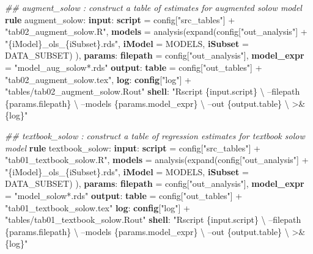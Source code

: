 \documentclass[]{book}
\newenvironment{Shaded}{\begin{snugshade}}{\end{snugshade}}
\newcommand{\KeywordTok}[1]{\textcolor[rgb]{0.13,0.29,0.53}{\textbf{{#1}}}}
\newcommand{\StringTok}[1]{\textcolor[rgb]{0.31,0.60,0.02}{{#1}}}
\newcommand{\CommentTok}[1]{\textcolor[rgb]{0.56,0.35,0.01}{\textit{{#1}}}}
\newcommand{\NormalTok}[1]{{#1}}
\theoremstyle{definition}
\theoremstyle{definition}
\theoremstyle{definition}
\theoremstyle{remark}
\begin{document}
\begin{Shaded}
\begin{Highlighting}[]
\CommentTok{## augment_solow      : construct a table of estimates for augmented solow model}
\KeywordTok{rule} \NormalTok{augment_solow:}
    \KeywordTok{input}\NormalTok{:}
        \KeywordTok{script} \NormalTok{= config[}\StringTok{"src_tables"}\NormalTok{] + }\StringTok{"tab02_augment_solow.R"}\NormalTok{,}
        \KeywordTok{models} \NormalTok{= analysis(expand(config[}\StringTok{"out_analysis"}\NormalTok{] +}
                            \StringTok{"\{iModel\}_ols_\{iSubset\}.rds"}\NormalTok{,}
                            \KeywordTok{iModel} \NormalTok{= MODELS,}
                            \KeywordTok{iSubset} \NormalTok{= DATA_SUBSET)}
                            \NormalTok{),}
    \KeywordTok{params}\NormalTok{:}
        \KeywordTok{filepath}   \NormalTok{= config[}\StringTok{"out_analysis"}\NormalTok{],}
        \KeywordTok{model_expr} \NormalTok{= }\StringTok{"model_aug_solow*.rds"}
    \KeywordTok{output}\NormalTok{:}
        \KeywordTok{table} \NormalTok{= config[}\StringTok{"out_tables"}\NormalTok{] + }\StringTok{"tab02_augment_solow.tex"}\NormalTok{,}
    \KeywordTok{log}\NormalTok{:}
        \KeywordTok{config}\NormalTok{[}\StringTok{"log"}\NormalTok{] + }\StringTok{"tables/tab02_augment_solow.Rout"}
    \KeywordTok{shell}\NormalTok{:}
        \StringTok{"Rscript \{input.script\} \textbackslash{}}
\StringTok{            --filepath \{params.filepath\} \textbackslash{}}
\StringTok{            --models \{params.model_expr\} \textbackslash{}}
\StringTok{            --out \{output.table\} \textbackslash{}}
\StringTok{            >& \{log\}"}

\CommentTok{## textbook_solow     : construct a table of regression estimates for textbook solow model}
\KeywordTok{rule} \NormalTok{textbook_solow:}
    \KeywordTok{input}\NormalTok{:}
        \KeywordTok{script} \NormalTok{= config[}\StringTok{"src_tables"}\NormalTok{] + }\StringTok{"tab01_textbook_solow.R"}\NormalTok{,}
        \KeywordTok{models} \NormalTok{= analysis(expand(config[}\StringTok{"out_analysis"}\NormalTok{] +}
                            \StringTok{"\{iModel\}_ols_\{iSubset\}.rds"}\NormalTok{,}
                            \KeywordTok{iModel} \NormalTok{= MODELS,}
                            \KeywordTok{iSubset} \NormalTok{= DATA_SUBSET)}
                            \NormalTok{),}
    \KeywordTok{params}\NormalTok{:}
        \KeywordTok{filepath}   \NormalTok{= config[}\StringTok{"out_analysis"}\NormalTok{],}
        \KeywordTok{model_expr} \NormalTok{= }\StringTok{"model_solow*.rds"}
    \KeywordTok{output}\NormalTok{:}
        \KeywordTok{table} \NormalTok{= config[}\StringTok{"out_tables"}\NormalTok{] + }\StringTok{"tab01_textbook_solow.tex"}
    \KeywordTok{log}\NormalTok{:}
        \KeywordTok{config}\NormalTok{[}\StringTok{"log"}\NormalTok{] + }\StringTok{"tables/tab01_textbook_solow.Rout"}
    \KeywordTok{shell}\NormalTok{:}
        \StringTok{"Rscript \{input.script\} \textbackslash{}}
\StringTok{            --filepath \{params.filepath\} \textbackslash{}}
\StringTok{            --models \{params.model_expr\} \textbackslash{}}
\StringTok{            --out \{output.table\} \textbackslash{}}
\StringTok{            >& \{log\}"}


\end{Highlighting}
\end{Shaded}
\end{document}
